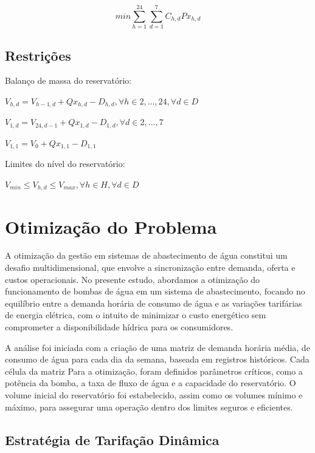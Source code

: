 $$min \sum_{h=1}^{24} \sum_{d=1}^{7} C_{h,d} P x_{h,d}$$

\subsection{Restrições}

Balanço de massa do reservatório:

\BlankLine

$V_{h,d} = V_{h-1,d} + Q x_{h,d} - D_{h,d}, \forall h \in {2, ..., 24}, \forall d \in D$

$V_{1,d} = V_{24,d-1} + Q x_{1,d} - D_{1,d}, \forall d \in {2, ..., 7}$

$V_{1,1} = V_0 + Q x_{1,1} - D_{1,1}$

\BlankLine

Limites do nível do reservatório:

\BlankLine

 $V_{min} \leq V_{h,d} \leq V_{max}, \forall h \in H, \forall d \in D$


\section{Otimização do Problema}

A otimização da gestão em sistemas de abastecimento de água constitui um desafio multidimensional, que envolve a sincronização entre demanda, oferta e custos operacionais. No presente estudo, abordamos a otimização do funcionamento de bombas de água em um sistema de abastecimento, focando no equilíbrio entre a demanda horária de consumo de água e as variações tarifárias de energia elétrica, com o intuito de minimizar o custo energético sem comprometer a disponibilidade hídrica para os consumidores.

A análise foi iniciada com a criação de uma matriz de demanda horária média, de consumo de água para cada dia da semana, baseada em registros históricos. Cada célula da matriz 
Para a otimização, foram definidos parâmetros críticos, como a potência da bomba, a taxa de fluxo de água e a capacidade do reservatório. O volume inicial do reservatório foi estabelecido, assim como os volumes mínimo e máximo, para assegurar uma operação dentro dos limites seguros e eficientes.


\subsection{Estratégia de Tarifação Dinâmica}

